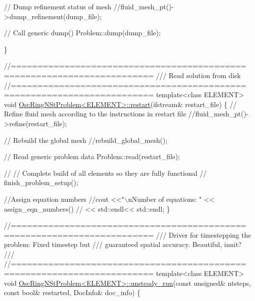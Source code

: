 \begin{DoxyCodeInclude}
{{{{{ \textcolor{comment}{// Dump refinement status of mesh}
 \textcolor{comment}{//fluid\_mesh\_pt()->dump\_refinement(dump\_file);}

 \textcolor{comment}{// Call generic dump()}
 Problem::dump(dump\_file);
  
\}



\textcolor{comment}{//========================================================================}\textcolor{comment}{}
\textcolor{comment}{/// Read solution from disk}
\textcolor{comment}{}\textcolor{comment}{//========================================================================}
\textcolor{keyword}{template}<\textcolor{keyword}{class} ELEMENT>
\textcolor{keywordtype}{void} \hyperlink{classOscRingNStProblem_a0cf01737b8d53213d644413e84251d0f}{OscRingNStProblem<ELEMENT>::restart}(ifstream& restart\_file)
\{
 \textcolor{comment}{// Refine fluid mesh according to the instructions in restart file}
 \textcolor{comment}{//fluid\_mesh\_pt()->refine(restart\_file);}

 \textcolor{comment}{// Rebuild the global mesh}
 \textcolor{comment}{//rebuild\_global\_mesh();}

 \textcolor{comment}{// Read generic problem data}
 Problem::read(restart\_file);

\textcolor{comment}{//   // Complete build of all elements so they are fully functional}
\textcolor{comment}{//  finish\_problem\_setup();}
 
 \textcolor{comment}{//Assign equation numbers}
 \textcolor{comment}{//cout <<"\(\backslash\)nNumber of equations: " << assign\_eqn\_numbers() }
 \textcolor{comment}{//     << std::endl<< std::endl; }
\}



\textcolor{comment}{//========================================================================}\textcolor{comment}{}
\textcolor{comment}{/// Driver for timestepping the problem: Fixed timestep but }
\textcolor{comment}{/// guaranteed spatial accuracy. Beautiful, innit?}
\textcolor{comment}{///}
\textcolor{comment}{}\textcolor{comment}{//========================================================================}
\textcolor{keyword}{template}<\textcolor{keyword}{class} ELEMENT>
\textcolor{keywordtype}{void} \hyperlink{classOscRingNStProblem_a00e957fb6a313a9c1de784d0fa3a7a36}{OscRingNStProblem<ELEMENT>::unsteady\_run}(\textcolor{keyword}{const} \textcolor{keywordtype}{unsigned}& 
      ntsteps,
                                              \textcolor{keyword}{const} \textcolor{keywordtype}{bool}& restarted,
                                              DocInfo& doc\_info)
\{ 

}}}}}
\end{DoxyCodeInclude}
